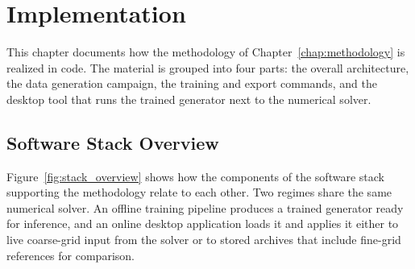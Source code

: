 \chapter{Implementation}
\label{chap:implementation}

This chapter documents how the methodology of Chapter~\ref{chap:methodology} is realized in code. The material is grouped into four parts: the overall architecture, the data generation campaign, the training and export commands, and the desktop tool that runs the trained generator next to the numerical solver.

\section{Software Stack Overview}
\label{sec:impl_overview}

Figure~\ref{fig:stack_overview} shows how the components of the software stack supporting the methodology relate to each other. Two regimes share the same numerical solver. An offline training pipeline produces a trained generator ready for inference, and an online desktop application loads it and applies it either to live coarse-grid input from the solver or to stored archives that include fine-grid references for comparison.

